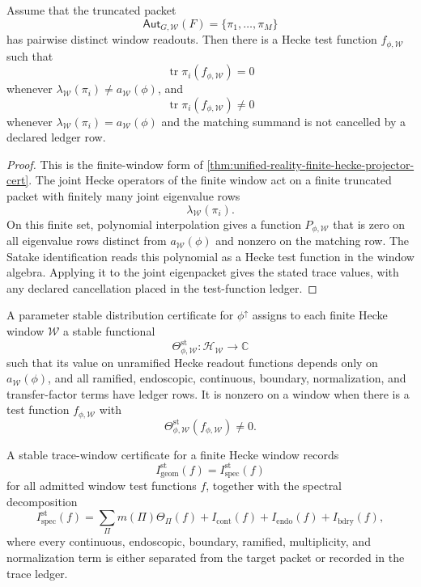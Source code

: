 \begin{theorem}
\label{thm:unified-reality-finite-hecke-window-separation}
Assume that the truncated packet
$$
\mathsf{Aut}_{G,\mathcal W}(F)=\{\pi_1,\ldots,\pi_M\}
$$
has pairwise distinct window readouts. Then there is a Hecke test
function $f_{\phi,\mathcal W}$ such that
$$
\operatorname{tr}\pi_i(f_{\phi,\mathcal W})=0
$$
whenever $\lambda_{\mathcal W}(\pi_i)\ne a_{\mathcal W}(\phi)$, and
$$
\operatorname{tr}\pi_i(f_{\phi,\mathcal W})\ne0
$$
whenever $\lambda_{\mathcal W}(\pi_i)=a_{\mathcal W}(\phi)$ and the
matching summand is not cancelled by a declared ledger row.
\end{theorem}
\begin{proof}
This is the finite-window form of
\autoref{thm:unified-reality-finite-hecke-projector-cert}. The joint
Hecke operators of the finite window act on a finite
truncated packet with finitely many joint eigenvalue rows
$$
\lambda_{\mathcal W}(\pi_i).
$$
On this finite set, polynomial interpolation gives a function
$P_{\phi,\mathcal W}$ that is zero on all eigenvalue rows distinct from
$a_{\mathcal W}(\phi)$ and nonzero on the matching row. The Satake
identification reads this polynomial as a Hecke test function in the
window algebra. Applying it to the joint eigenpacket gives the stated
trace values, with any declared cancellation placed in the test-function
ledger.
\end{proof}

\begin{definition}
\label{def:unified-reality-parameter-stable-distribution-certificate}
A parameter stable distribution certificate for $\phi^{\uparrow}$
assigns to each finite Hecke window $\mathcal W$ a stable functional
$$
\Theta_{\phi,\mathcal W}^{\mathrm{st}}:
\mathcal H_{\mathcal W}\to\mathbb C
$$
such that its value on unramified Hecke readout functions depends only
on $a_{\mathcal W}(\phi)$, and all ramified, endoscopic, continuous,
boundary, normalization, and transfer-factor terms have ledger rows.
It is nonzero on a window when there is a test function
$f_{\phi,\mathcal W}$ with
$$
\Theta_{\phi,\mathcal W}^{\mathrm{st}}(f_{\phi,\mathcal W})\ne0.
$$
\end{definition}

\begin{definition}
\label{def:unified-reality-stable-trace-window-certificate}
A stable trace-window certificate for a finite Hecke window records
$$
I_{\mathrm{geom}}^{\mathrm{st}}(f)
=
I_{\mathrm{spec}}^{\mathrm{st}}(f)
$$
for all admitted window test functions $f$, together with the spectral
decomposition
$$
I_{\mathrm{spec}}^{\mathrm{st}}(f)
=
\sum_{\Pi}m(\Pi)\Theta_{\Pi}(f)
+I_{\mathrm{cont}}(f)
+I_{\mathrm{endo}}(f)
+I_{\mathrm{bdry}}(f),
$$
where every continuous, endoscopic, boundary, ramified, multiplicity, and
normalization term is either separated from the target packet or
recorded in the trace ledger.
\end{definition}

